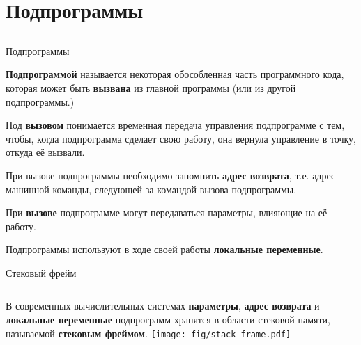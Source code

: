 \documentclass[utf8, russian]{beamer}
\begin{document}
    \section{Подпрограммы}
    \subsection{}
    \begin{frame}{Подпрограммы}

        {\bf Подпрограммой} называется некоторая обособленная часть программного кода, которая может быть {\bf вызвана} из главной программы (или из другой подпрограммы.)
        \bigskip

        Под {\bf вызовом} понимается временная передача управления подпрограмме с тем, чтобы, когда подпрограмма сделает свою работу, она вернула управление в точку, откуда её вызвали.

        \bigskip
        При вызове подпрограммы необходимо запомнить {\bf адрес возврата}, т.е. адрес машинной команды, следующей за командой вызова подпрограммы.
        \bigskip

        При {\bf вызове} подпрограмме могут передаваться параметры, влияющие на её работу.
        \bigskip

        Подпрограммы используют в ходе своей работы {\bf локальные переменные}.
    \end{frame}
    \begin{frame}{Стековый фрейм}
        \begin{columns}
        В современных вычислительных системах {\bf параметры}, {\bf адрес возврата} и {\bf локальные переменные} подпрограмм хранятся в области стековой памяти, называемой {\bf стековым фреймом}.
        \texttt{[image: fig/stack\_frame.pdf]}
        \end{columns}
    \end{frame}
\end{document}
